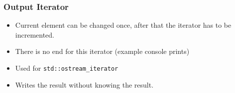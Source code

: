\subsubsection{Output Iterator}
\begin{itemize}
  \itemsep -0.5em 
  \item Current element can be changed once, after that the iterator has to be incremented.
  \item There is no end for this iterator (example console prints)
  \item Used for \lstinline|std::ostream_iterator|
  \item Writes the result without knowing the result.
\end{itemize}




\break